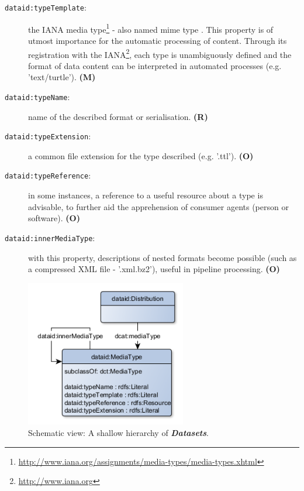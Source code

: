 \documentclass[a4paper,english,twoside,BCOR1.5cm,headsepline,DIV12,appendixprefix,final,12pt]{scrbook}
\newcommand{\prop}[1]{{{\texttt{#1}}}}
\newcommand{\important}[1]{\textbf{\textit{#1}}}
\newcommand\footnoteurl[1]{\footnote{\scriptsize\url{#1}}}
\begin{document}
\begin{description}
\item[\prop{dataid:typeTemplate}:] the IANA media type\footnoteurl{http://www.iana.org/assignments/media-types/media-types.xhtml} - also named mime type \cite{freed1996rfc2046}. This property is of utmost importance for the automatic processing of content. Through its registration with the IANA\footnoteurl{http://www.iana.org}, each type is unambiguously defined and the format of data content can be interpreted in automated processes (e.g. 'text/turtle'). \textbf{(M)}
\item[\prop{dataid:typeName}:] name of the described format or serialisation. \textbf{(R)}
\item[\prop{dataid:typeExtension}:] a common file extension for the type described (e.g. '.ttl'). \textbf{(O)}
\item[\prop{dataid:typeReference}:] in some instances, a reference to a useful resource about a type is advisable, to further aid the apprehension of consumer agents (person or software). \textbf{(O)}
\item[\prop{dataid:innerMediaType}:] with this property, descriptions of nested formats become possible (such as a compressed XML file - '.xml.bz2'), useful in pipeline processing. \textbf{(O)}
\end{description}

\begin{figure}[!htbp]
\centering
  \includegraphics[width=7cm]{images/ClassMediaType.png}
  \caption{Schematic view: A shallow hierarchy of \important{Datasets}.}
  \label{fig:example}
\end{figure}
\end{document}
